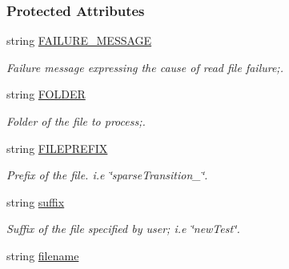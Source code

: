 \subsubsection*{Protected Attributes}
\begin{DoxyCompactItemize}
\item 
\hypertarget{class_file_coordinator_ab8313bec8a35d369ef65d59822dd6c68}{string \hyperlink{class_file_coordinator_ab8313bec8a35d369ef65d59822dd6c68}{F\+A\+I\+L\+U\+R\+E\+\_\+\+M\+E\+S\+S\+A\+G\+E}}\label{class_file_coordinator_ab8313bec8a35d369ef65d59822dd6c68}

\begin{DoxyCompactList}\small\item\em Failure message expressing the cause of read file failure;. \end{DoxyCompactList}\item 
\hypertarget{class_file_coordinator_aa78d3f7b41ca66e461b0ff4c8b488821}{string \hyperlink{class_file_coordinator_aa78d3f7b41ca66e461b0ff4c8b488821}{F\+O\+L\+D\+E\+R}}\label{class_file_coordinator_aa78d3f7b41ca66e461b0ff4c8b488821}

\begin{DoxyCompactList}\small\item\em Folder of the file to process;. \end{DoxyCompactList}\item 
\hypertarget{class_file_coordinator_a6d9ec231c41442f9d71ad62838bdb2fe}{string \hyperlink{class_file_coordinator_a6d9ec231c41442f9d71ad62838bdb2fe}{F\+I\+L\+E\+P\+R\+E\+F\+I\+X}}\label{class_file_coordinator_a6d9ec231c41442f9d71ad62838bdb2fe}

\begin{DoxyCompactList}\small\item\em Prefix of the file. i.\+e \char`\"{}sparse\+Transition\+\_\+\char`\"{}. \end{DoxyCompactList}\item 
\hypertarget{class_file_coordinator_ac92f75a0e19bff63fafc40217688f927}{string \hyperlink{class_file_coordinator_ac92f75a0e19bff63fafc40217688f927}{suffix}}\label{class_file_coordinator_ac92f75a0e19bff63fafc40217688f927}

\begin{DoxyCompactList}\small\item\em Suffix of the file specified by user; i.\+e \char`\"{}new\+Test\char`\"{}. \end{DoxyCompactList}\item 
\hypertarget{class_file_coordinator_a439cb1f8132fd37e04f92ac67f89c1df}{string \hyperlink{class_file_coordinator_a439cb1f8132fd37e04f92ac67f89c1df}{filename}}\label{class_file_coordinator_a439cb1f8132fd37e04f92ac67f89c1df}


\end{DoxyCompactItemize}
